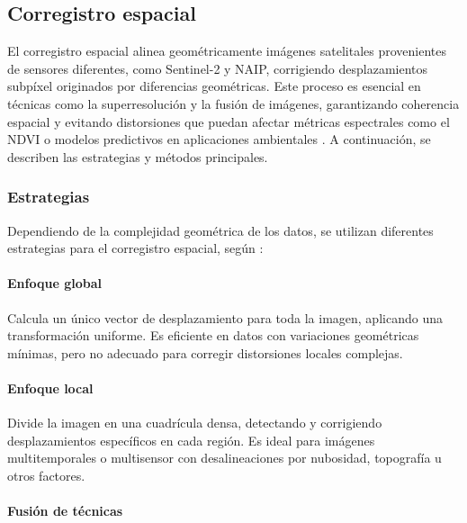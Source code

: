         
    \subsection{Corregistro espacial}

        El corregistro espacial alinea geométricamente imágenes satelitales provenientes de sensores diferentes, como Sentinel-2 y NAIP, corrigiendo desplazamientos subpíxel originados por diferencias geométricas. Este proceso es esencial en técnicas como la superresolución y la fusión de imágenes, garantizando coherencia espacial y evitando distorsiones que puedan afectar métricas espectrales como el NDVI o modelos predictivos en aplicaciones ambientales \autocite{malczewska2023challenges}. A continuación, se describen las estrategias y métodos principales.
        
        \subsubsection{Estrategias}

            Dependiendo de la complejidad geométrica de los datos, se utilizan diferentes estrategias para el corregistro espacial, según \textcite{scheffler2017arosics}:
            

            \paragraph{Enfoque global}

                Calcula un único vector de desplazamiento para toda la imagen, aplicando una transformación uniforme. Es eficiente en datos con variaciones geométricas mínimas, pero no adecuado para corregir distorsiones locales complejas.
            
            \paragraph{Enfoque local}

                Divide la imagen en una cuadrícula densa, detectando y corrigiendo desplazamientos específicos en cada región. Es ideal para imágenes multitemporales o multisensor con desalineaciones por nubosidad, topografía u otros factores.
            
            \paragraph{Fusión de técnicas} 
            
